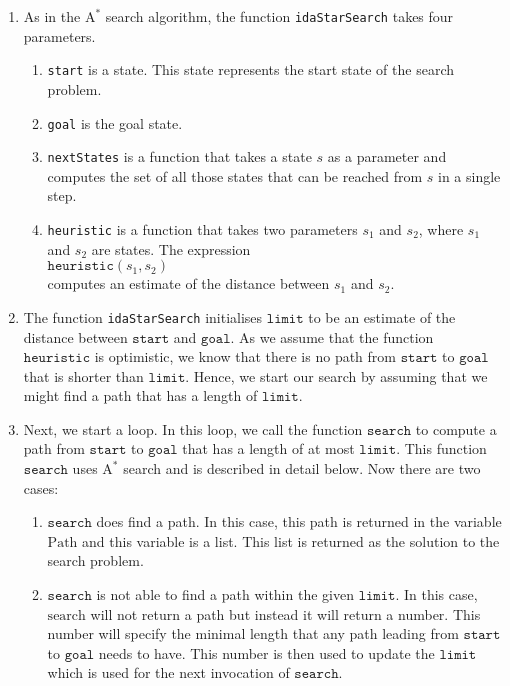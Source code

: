 \begin{enumerate}
\item As in the $\mathrm{A}^*$ search algorithm, the function \texttt{idaStarSearch} takes four parameters.
      \begin{enumerate}
      \item \texttt{start} is a state.  This state represents the start state of the search problem.
      \item \texttt{goal} is the goal state.  
      \item \texttt{nextStates} is a function that takes a state $s$ as a parameter and 
            computes the set of all those states that can be reached from $s$ in a single step.
      \item \texttt{heuristic} is a function that takes two parameters $s_1$ and $s_2$, where $s_1$ and $s_2$
            are states. The expression
            \\[0.2cm]
            \hspace*{1.3cm}
            $\texttt{heuristic}(s_1, s_2)$ 
            \\[0.2cm]
            computes an estimate of the distance between $s_1$ and $s_2$.
     \end{enumerate}
\item The function \texttt{idaStarSearch} initialises $\mathtt{limit}$ to be an estimate of the distance
      between $\mathtt{start}$ and $\mathtt{goal}$.  As we assume that the function $\mathtt{heuristic}$ is
      optimistic, we know that there is no path from $\mathtt{start}$ to $\mathtt{goal}$ that is shorter than
      $\mathtt{limit}$.  Hence, we start our search by assuming that we might find a path that has a length of 
      $\mathtt{limit}$.
\item Next, we start a loop.  In this loop, we call the function $\mathtt{search}$ to compute a path from
      $\mathtt{start}$ to $\mathtt{goal}$ that has a length of at most $\mathtt{limit}$.  This function
      $\mathtt{search}$ uses $\mathrm{A}^*$ search and is described in detail below.
      Now there are two cases:
      \begin{enumerate}
      \item $\mathtt{search}$ does find a path.  In this case, this path is returned in the variable
            $\mathrm{Path}$ and this variable is a list.  This list is returned as the solution to the search
            problem.
      \item $\mathtt{search}$ is not able to find a path within the given $\mathtt{limit}$.  In this case,
            $\mathrm{search}$ will not return a path but instead it will return a number.  This number will
            specify the minimal length that any path leading from $\mathtt{start}$ to $\mathtt{goal}$ needs to
            have.  This number is then used to update the $\mathtt{limit}$ which is used for the next
            invocation of $\mathtt{search}$.


\end{enumerate}
\end{enumerate}
